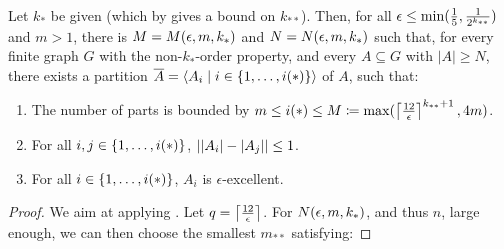        \begin{theorem} \label{thm:minimal_conditions_for_excellent_partitions}
            Let $k_*$ be given (which by  gives a bound on $k_{**}$).
            Then, for all $\epsilon \leq \min ( \frac{1}{5}, \frac{1}{2^{k_{**}}} )$ and $m > 1$, there is $M = M( \epsilon, m, k_* )$
            and $N = N( \epsilon, m, k_* )$ such that, for every finite graph $G$ with the non-$k_{*}$-order property, and
            every $A \subseteq G$ with $|A| \geq N$, there exists a partition $\overline{A} = \left< A_i \mid i \in \{ 1, \dots, i(*) \} \right>$
            of $A$, such that:
            \begin{enumerate}[label={\Roman*}., ref={\Roman*}, font=\rmfamily]
                \item \label{itm:minimal_conditions_for_excellent_partitions.0} The number of parts is bounded by
                    $m \leq i(*) \leq M \coloneqq \max ( \left\lceil \frac{12}{\epsilon} \right\rceil^{k_{**}+1}, 4m )$.
                \item \label{itm:minimal_conditions_for_excellent_partitions.1}
                    For all $i, j \in \{ 1, \dots, i(*) \}$, $| | A_i |- | A_j | | \leq 1$.
                \item \label{itm:minimal_conditions_for_excellent_partitions.2}
                    For all $i \in \{ 1, \dots, i(*) \}$, $A_i$ is $\epsilon$-excellent.
            \end{enumerate}
            \begin{proof}
                We aim at applying .
                Let $q = \left\lceil \frac{12}{\epsilon} \right\rceil$.
                For $N( \epsilon, m, k_* )$, and thus $n$, large enough, we can then choose the smallest $m_{**}$ satisfying:
\end{proof}
\end{theorem}
